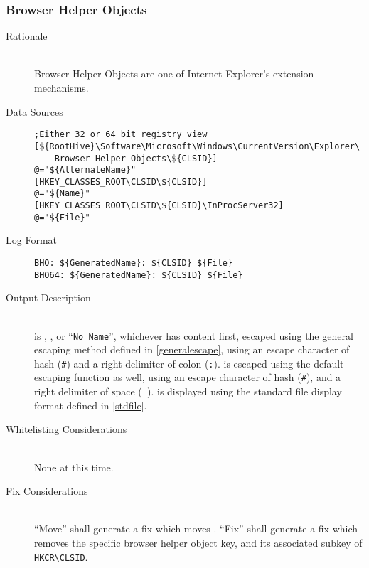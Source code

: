 \subsubsection{Browser Helper Objects}
\begin{description}
\item[Rationale] \hfill \\
Browser Helper Objects are one of Internet Explorer's extension mechanisms.
\item[Data Sources] \hfill
\vspace{-\baselineskip}
\begin{verbatim}
;Either 32 or 64 bit registry view
[${RootHive}\Software\Microsoft\Windows\CurrentVersion\Explorer\
    Browser Helper Objects\${CLSID}]
@="${AlternateName}"
[HKEY_CLASSES_ROOT\CLSID\${CLSID}]
@="${Name}"
[HKEY_CLASSES_ROOT\CLSID\${CLSID}\InProcServer32]
@="${File}"
\end{verbatim}
\item[Log Format] \hfill
\vspace{-\baselineskip}
\begin{verbatim}
BHO: ${GeneratedName}: ${CLSID} ${File}
BHO64: ${GeneratedName}: ${CLSID} ${File}
\end{verbatim}
\item[Output Description] \hfill \\
 is , , or ``\verb|No Name|'',
whichever has content first, escaped using the general escaping method defined
in \ref{generalescape}, using an escape character of hash (\verb|#|) and a right
delimiter of colon (\verb|:|). \var{CLSID} is escaped using the default escaping
function as well, using an escape character of hash (\verb|#|), and a right
delimiter of space (\verb| |). \var{File} is displayed using the standard file
display format defined in \ref{stdfile}.
\item[Whitelisting Considerations] \hfill \\
None at this time.
\item[Fix Considerations] \hfill \\
``Move'' shall generate a fix which moves . ``Fix'' shall generate a
fix which removes the specific browser helper object key, and its associated
subkey of \verb|HKCR\CLSID|.
\end{description}

